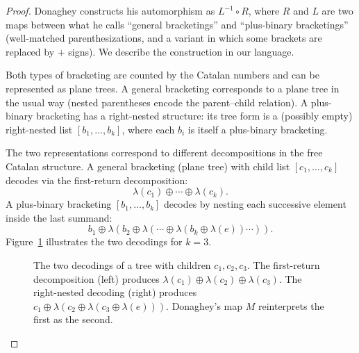 \documentclass[a4paper,11pt]{article}
\theoremstyle{definition}
\begin{document}
\begin{proof}
Donaghey constructs his automorphism as $L^{-1} \circ R$,
where $R$ and $L$ are two maps between what he calls
``general bracketings'' and ``plus-binary bracketings''
(well-matched parenthesizations, and a variant in which
some brackets are replaced by $+$ signs). We describe
the construction in our language.

Both types of bracketing are counted by the Catalan
numbers and can be represented as plane trees. A general
bracketing corresponds to a plane tree in the usual way
(nested parentheses encode the parent--child relation).
A plus-binary bracketing has a right-nested structure:
its tree form is a (possibly empty) right-nested list
$[b_1, \ldots, b_k]$, where each $b_i$ is itself a
plus-binary bracketing.

The two representations correspond to different
decompositions in the free Catalan structure.
A general bracketing (plane tree) with child list
$[c_1, \ldots, c_k]$ decodes via the first-return
decomposition:
\[
  \lambda(c_1) \oplus \cdots \oplus \lambda(c_k).
\]
A plus-binary bracketing $[b_1, \ldots, b_k]$ decodes
by nesting each successive element inside the last
summand:
\[
  b_1 \oplus \lambda(b_2 \oplus
    \lambda(\cdots \oplus \lambda(b_k \oplus
    \lambda(e)) \cdots)).
\]
Figure~\ref{fig:donaghey-decoding} illustrates the two
decodings for $k = 3$.

\begin{figure}[ht]
\centering
{}
\caption{The two decodings of a tree with children
$c_1, c_2, c_3$. The first-return decomposition
(left) produces
$\lambda(c_1) \oplus \lambda(c_2) \oplus \lambda(c_3)$.
The right-nested decoding (right) produces
$c_1 \oplus \lambda(c_2 \oplus
\lambda(c_3 \oplus \lambda(e)))$.
Donaghey's map $M$ reinterprets the first as
the second.}
\label{fig:donaghey-decoding}
\end{figure}


\end{proof}
\end{document}
